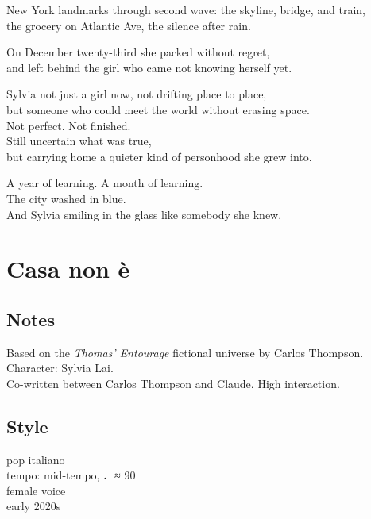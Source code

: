 \begin{lyrics}
New York landmarks through second wave: the skyline, bridge, and train,\\
the grocery on Atlantic Ave, the silence after rain.

On December twenty-third she packed without regret,\\
and left behind the girl who came not knowing herself yet.

Sylvia not just a girl now, not drifting place to place,\\
but someone who could meet the world without erasing space.\\
Not perfect. Not finished.\\
Still uncertain what was true,\\
but carrying home a quieter kind of personhood she grew into.

A year of learning. A month of learning.\\
The city washed in blue.\\
And Sylvia smiling in the glass like somebody she knew.

\end{lyrics}

\section{Casa non è}

\subsection{Notes}
Based on the \emph{Thomas' Entourage} fictional universe by Carlos Thompson.\\
Character: Sylvia Lai.\\
Co-written between Carlos Thompson and Claude. High interaction.

\subsection{Style}
pop italiano\\
tempo: mid-tempo, ♩≈ 90\\
female voice\\
early 2020s

